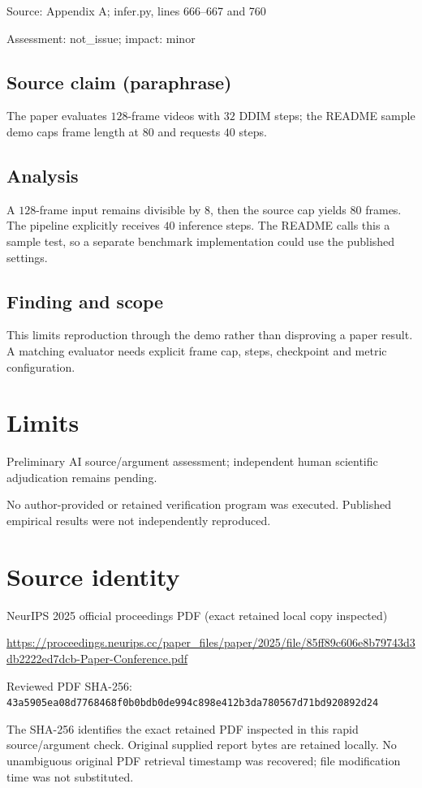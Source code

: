 \documentclass[11pt]{article}
\begin{document}
Source: Appendix A; infer.py, lines 666–667 and 760

Assessment: not\_issue; impact: minor

\subsection*{Source claim (paraphrase)}

The paper evaluates \(128\)-frame videos with \(32\) DDIM steps; the README sample demo caps frame length at \(80\) and requests \(40\) steps.

\subsection*{Analysis}

A \(128\)-frame input remains divisible by \(8\), then the source cap yields \(80\) frames. The pipeline explicitly receives \(40\) inference steps. The README calls this a sample test, so a separate benchmark implementation could use the published settings.

\subsection*{Finding and scope}

This limits reproduction through the demo rather than disproving a paper result. A matching evaluator needs explicit frame cap, steps, checkpoint and metric configuration.

\section*{Limits}

Preliminary AI source/argument assessment; independent human scientific adjudication remains pending.\par

No author-provided or retained verification program was executed. Published empirical results were not independently reproduced.\par

\section*{Source identity}

NeurIPS 2025 official proceedings PDF (exact retained local copy inspected)

\url{https://proceedings.neurips.cc/paper_files/paper/2025/file/85ff89c606e8b79743d3db2222ed7dcb-Paper-Conference.pdf}

Reviewed PDF SHA-256: \nolinkurl{43a5905ea08d7768468f0b0bdb0de994c898e412b3da780567d71bd920892d24}

The SHA-256 identifies the exact retained PDF inspected in this rapid source/argument check. Original supplied report bytes are retained locally. No unambiguous original PDF retrieval timestamp was recovered; file modification time was not substituted.
\end{document}
